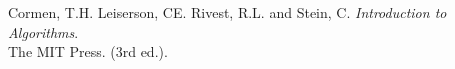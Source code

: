 \begin{thebibliography}{9}

	Cormen, T.H. Leiserson, CE. Rivest, R.L. and Stein, C. \textit{Introduction to Algorithms}.\\
	The MIT Press. (3rd ed.).

\end{thebibliography}

